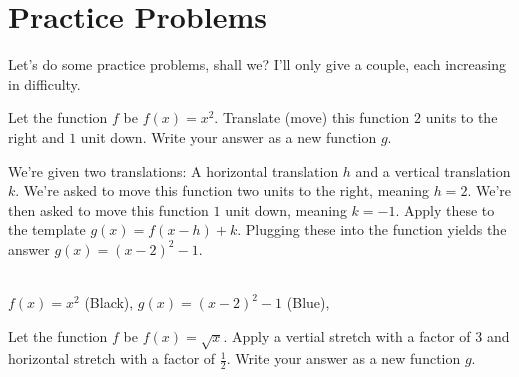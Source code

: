 \clearpage
\section{Practice Problems}
Let's do some practice problems, shall we? I'll only give a couple, each increasing in difficulty.

\begin{problem}
    Let the function $f$ be $f(x) = x^2$. Translate (move) this function $2$ units to the right and $1$ unit down. Write your answer as a new function $g$.
\end{problem}
\begin{solution}
    We're given two translations: A horizontal translation $h$ and a vertical translation $k$. We're asked to move this function two units to the right, meaning $h = 2$. We're then asked to move this function $1$ unit down, meaning $k = -1$. Apply these to the template $g(x) = f(x - h) + k$.
    Plugging these into the function yields the answer $\boxed{g(x) = (x - 2)^2 - 1}$.
\begin{center}
    \\
    $f(x) = x^2$ (Black), 
    $g(x) = (x - 2)^2 - 1$ (Blue),
\end{center}
\end{solution}\clearpage
\begin{problem}
    Let the function $f$ be $f(x) = \sqrt{x}$. Apply a vertial stretch with a factor of $3$ and horizontal stretch with a factor of $\frac{1}{2}$. Write your answer as a new function $g$.
\end{problem}
